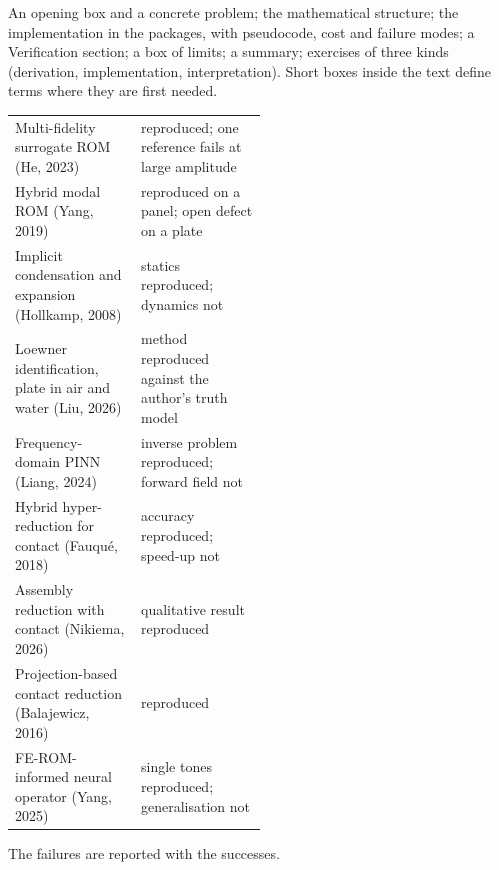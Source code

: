 \newpage\thispagestyle{hl}
An opening box and a concrete problem; the mathematical structure; the implementation in the packages, with pseudocode, cost and failure modes; a Verification section; a box of limits; a summary; exercises of three kinds (derivation, implementation, interpretation). Short boxes inside the text define terms where they are first needed.
{\small\begin{tabularx}{\linewidth}{@{}>{\raggedright\arraybackslash}p{0.5\linewidth}X@{}}
Multi-fidelity surrogate ROM (He, 2023) & reproduced; one reference fails at large amplitude \\
Hybrid modal ROM (Yang, 2019) & reproduced on a panel; open defect on a plate \\
Implicit condensation and expansion (Hollkamp, 2008) & statics reproduced; dynamics not \\
Loewner identification, plate in air and water (Liu, 2026) & method reproduced against the author's truth model \\
Frequency-domain PINN (Liang, 2024) & inverse problem reproduced; forward field not \\
Hybrid hyper-reduction for contact (Fauqu\'e, 2018) & accuracy reproduced; speed-up not \\
Assembly reduction with contact (Nikiema, 2026) & qualitative result reproduced \\
Projection-based contact reduction (Balajewicz, 2016) & reproduced \\
FE-ROM-informed neural operator (Yang, 2025) & single tones reproduced; generalisation not \\
\end{tabularx}}
{\small The failures are reported with the successes.}

